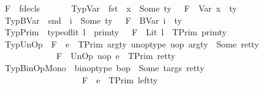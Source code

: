 \begin{isabellebody}
\ \ \ F\ {\isacharcolon}{\kern0pt}{\isacharcolon}{\kern0pt}\ fdecls\isanewline
\ \ \isanewline
\ \ \ \ TypVar{\isacharcolon}{\kern0pt}\ {\isachardoublequoteopen}{\isasymlbrakk}\ {\isacharparenleft}{\kern0pt}fst\ {\isasymDelta}{\isacharparenright}{\kern0pt}\ x\ {\isacharequal}{\kern0pt}\ Some\ ty\ {\isasymrbrakk}\ {\isasymLongrightarrow}\ F{\isacharcomma}{\kern0pt}{\isasymDelta}\ {\isasymturnstile}\ Var\ x\ {\isacharcolon}{\kern0pt}\ ty{\isachardoublequoteclose}\isanewline
\ \ {\isacharbar}{\kern0pt}\ TypBVar{\isacharcolon}{\kern0pt}\ {\isachardoublequoteopen}{\isasymlbrakk}\ {\isacharparenleft}{\kern0pt}snd\ {\isasymDelta}{\isacharparenright}{\kern0pt}\ i\ {\isacharequal}{\kern0pt}\ Some\ ty\ {\isasymrbrakk}\ {\isasymLongrightarrow}\ F{\isacharcomma}{\kern0pt}{\isasymDelta}\ {\isasymturnstile}\ BVar\ i\ {\isacharcolon}{\kern0pt}\ ty{\isachardoublequoteclose}\isanewline
\ \ {\isacharbar}{\kern0pt}\ TypPrim{\isacharcolon}{\kern0pt}\ {\isachardoublequoteopen}{\isasymlbrakk}\ type{\isacharunderscore}{\kern0pt}of{\isacharunderscore}{\kern0pt}lit\ l\ {\isacharequal}{\kern0pt}\ prim{\isacharunderscore}{\kern0pt}ty\ {\isasymrbrakk}\ {\isasymLongrightarrow}\ F{\isacharcomma}{\kern0pt}{\isasymDelta}\ {\isasymturnstile}\ Lit\ l\ {\isacharcolon}{\kern0pt}\ TPrim\ prim{\isacharunderscore}{\kern0pt}ty{\isachardoublequoteclose}\isanewline
\ \ {\isacharbar}{\kern0pt}\ TypUnOp{\isacharcolon}{\kern0pt}\ {\isachardoublequoteopen}{\isasymlbrakk}\ F{\isacharcomma}{\kern0pt}{\isasymDelta}\ {\isasymturnstile}\ e\ {\isacharcolon}{\kern0pt}\ TPrim\ arg{\isacharunderscore}{\kern0pt}ty{\isacharsemicolon}{\kern0pt}\ unop{\isacharunderscore}{\kern0pt}type\ uop\ arg{\isacharunderscore}{\kern0pt}ty\ {\isacharequal}{\kern0pt}\ Some\ ret{\isacharunderscore}{\kern0pt}ty\ {\isasymrbrakk}\ \ {\isasymLongrightarrow}\ \isanewline
\ \ \ \ \ \ \ \ \ \ \ \ \ \ \ F{\isacharcomma}{\kern0pt}{\isasymDelta}\ {\isasymturnstile}\ UnOp\ uop\ e\ {\isacharcolon}{\kern0pt}\ TPrim\ ret{\isacharunderscore}{\kern0pt}ty{\isachardoublequoteclose}\isanewline
\ \ {\isacharbar}{\kern0pt}\ TypBinOpMono{\isacharcolon}{\kern0pt}\ {\isachardoublequoteopen}{\isasymlbrakk}\ binop{\isacharunderscore}{\kern0pt}type\ bop\ {\isacharequal}{\kern0pt}\ Some\ {\isacharparenleft}{\kern0pt}targs{\isacharcomma}{\kern0pt}\ ret{\isacharunderscore}{\kern0pt}ty{\isacharparenright}{\kern0pt}{\isacharsemicolon}{\kern0pt}\ \isanewline
\ \ \ \ \ \ \ \ \ \ \ \ \ \ \ \ \ \ \ \ \ F{\isacharcomma}{\kern0pt}{\isasymDelta}\ {\isasymturnstile}\ e{}\ {\isacharcolon}{\kern0pt}\ TPrim\ left{\isacharunderscore}{\kern0pt}ty{\isacharsemicolon}{\kern0pt}\ \isanewline

\end{isabellebody}
